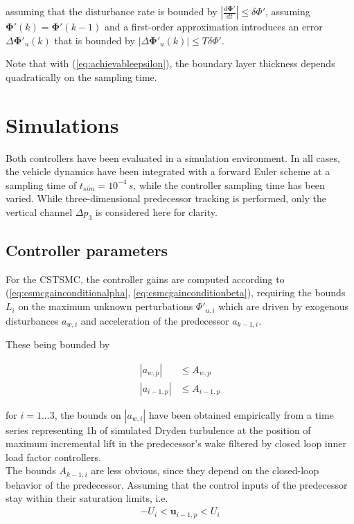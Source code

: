 \documentclass{ifacconf}
\providecommand{\mbf}[1]{\mathbf{#1}}
\newcommand{\idxFollower}{{\ensuremath{i} }}
\newcommand{\idxPredecessor}{{\ensuremath{i-1} }}
\newcommand{\idxSample}{{\ensuremath{k}}}
\newcommand{\idxAxis}{{\ensuremath{p}}}
\begin{document}
assuming that the disturbance rate is bounded by $|\frac{d \mbf{\Phi}'}{dt}| \leq \delta \Phi'$, assuming $\mbf{\Phi}'(\idxSample) = \mbf{\Phi}'(\idxSample-1)$ and a first-order approximation introduces an error $\Delta \mbf{\Phi}'_u(\idxSample)$ that is bounded by $|\Delta \mbf{\Phi}'_u(\idxSample)| \leq T \delta \Phi' $.

Note that with (\ref{eq:achievableepsilon}), the boundary layer thickness depends quadratically on the sampling time.

\section{Simulations}
\label{sec:simulations}

Both controllers have been evaluated in a simulation environment. In all cases, the vehicle dynamics have been integrated with a forward Euler scheme at a sampling time of $t_{sim} = 10^{-4} \, s$, while the controller sampling time has been varied. While three-dimensional predecessor tracking is performed, only the vertical channel $\Delta p_3$ is considered here for clarity.

\subsection{Controller parameters}

For the CSTSMC, the controller gains are computed according to (\ref{eq:csmcgainconditionalpha}, \ref{eq:csmcgainconditionbeta}), requiring the bounds $L_i$ on the maximum unknown perturbations $\Phi'_{u,i}$ which are driven by exogenous disturbances $a_{w,i}$ and acceleration of the predecessor $a_{k-1,i}$.

These being bounded by

\begin{align}
|a_{w,\idxAxis}| &\leq A_{w,\idxAxis} \\
|a_{\idxPredecessor,\idxAxis}| &\leq A_{\idxPredecessor,\idxAxis}
\end{align}

for $\idxFollower = 1...3$, the bounds on $|a_{w,i}|$ have been obtained empirically from a time series representing 1h of simulated Dryden turbulence at the position of maximum incremental lift in the predecessor's wake filtered by closed loop inner load factor controllers. \\
The bounds $A_{k-1,i}$ are less obvious, since they depend on the closed-loop behavior of the predecessor. Assuming that the control inputs of the predecessor stay within their saturation limits, i.e. 
\begin{align}
-{U}_i < \mbf{u}_{\idxPredecessor, \idxAxis} < {U}_i 
\label{eq:assumptionpredecessorinputs}
\end{align}
\end{document}
